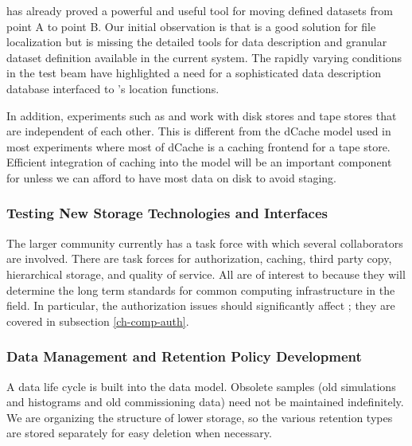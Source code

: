  has already proved a powerful and useful tool for moving defined datasets from point A to point B.  Our initial observation is that  is a good solution for file localization but is missing the detailed tools for data description and granular dataset definition available in the current  system.  The rapidly varying conditions in the test beam have highlighted a need for a sophisticated data description database interfaced to 's location functions. 

In addition,    experiments such as  and  work with disk stores and tape stores that are independent of each other.  This is different from the dCache model used in most  experiments where most of dCache is a caching frontend for a tape store.  Efficient integration of caching into the  model will be an important component for  unless  we can afford to have most data on disk to avoid staging.



\subsubsection{Testing New Storage Technologies and Interfaces}

The larger  community\cite{Berzano:2018xaa} currently has a  task force
 with which several  collaborators are involved. There are task forces for authorization, caching, third party copy, hierarchical storage, and quality of service. All are of interest to  because they will determine the long term standards for common computing infrastructure in the field. 
In particular, the authorization issues should significantly affect ; they are covered in subsection \ref{ch-comp-auth}.


\subsubsection{Data Management and Retention Policy Development}



A data life cycle is built into the  data model.  Obsolete samples (old simulations and histograms and old commissioning data) need not be maintained indefinitely.  
We are organizing the structure of lower storage, so the various retention types are stored separately for easy deletion when necessary.  

